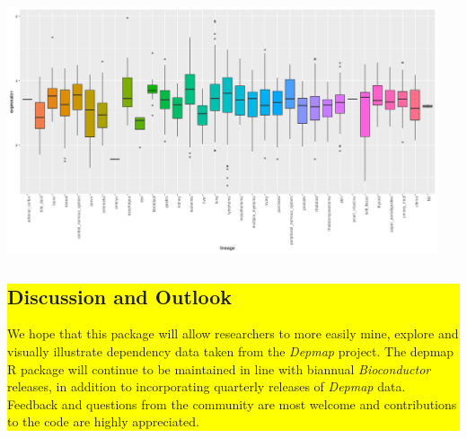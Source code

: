 \documentclass{article}
\newcommand{\hcode}[2][lgray]{{\ttfamily\color{vdgray}\colorbox{#1}{#2}}}
\begin{document}
\begin{multicols}{2}
\begin{minipage}[t]{\linewidth}
  \begin{center}
  \includegraphics[width=0.95\textwidth]{figs/new_exp.png}
  \end{center}
  \vspace{-0.5cm}
  \label{fig:exp_table}

\nocite{depmap2019depmap}
\nocite{meyers2017computational}
\nocite{mcfarland2018improved}
\nocite{ghandi2019next}
\nocite{li2019landscape}
\nocite{corsello2019non}
\nocite{dempster2019extracting}
\nocite{dunn2019oncogenic}
\nocite{tsherniak2017defining}

\end{minipage}

\vspace{.4cm}
\noindent
\colorbox{yellow}{
  \begin{minipage}[t]{0.965\linewidth}
    \vspace{.15cm}
    \section*{\huge Discussion and Outlook}
    \large 
    We hope that this package will allow researchers to more easily mine, explore and visually illustrate dependency data taken from the \textit{Depmap} project. The \hcode{depmap} R package will continue to be maintained in line with biannual \textit{Bioconductor} releases, in addition to incorporating quarterly releases of \textit{Depmap} data. Feedback and questions from the community are most welcome and contributions to the code are highly appreciated.
  \end{minipage}
}
% 
\noindent
\begin{minipage}[t]{\linewidth}
\vspace{0.4cm}

\end{minipage}
\end{multicols}
\end{document}
